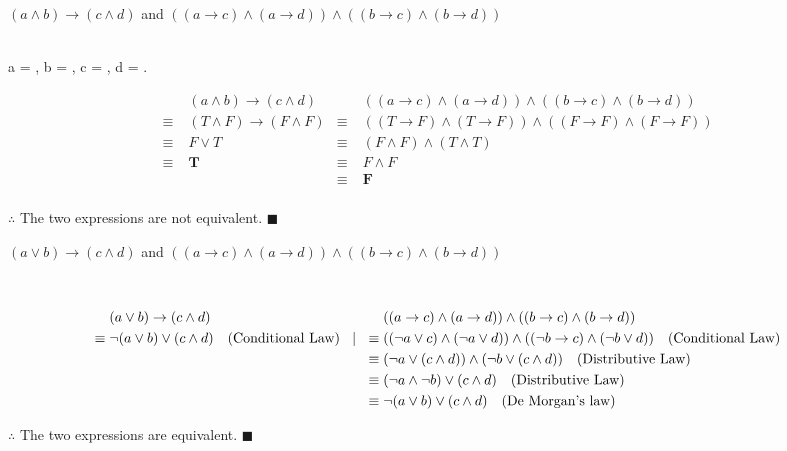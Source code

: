 \documentclass[]{article}
\begin{document}
\begin{question}
    $(a \land b) \rightarrow (c \land d)$ and $((a \rightarrow c) \land (a \rightarrow d)) \land ((b \rightarrow c) \land (b \rightarrow d))$
\end{question}
\begin{center}
         \\
         a = , b = , c = , d = .\\
\end{center}
\begin{align*}
    & (a \land b) \rightarrow (c \land d) & & ((a \rightarrow c) \land (a \rightarrow d)) \land ((b \rightarrow c) \land (b \rightarrow d))\\
    \equiv\; & (T \land F) \rightarrow (F \land F) & \equiv\; & ((T \rightarrow F) \land (T \rightarrow F)) \land ((F \rightarrow F) \land (F \rightarrow F)) \\
    \equiv\; & F \lor T & \equiv\; &  (F \land F) \land (T \land T)\\
    \equiv\; & \mathbf{T} & \equiv\; & F \land F \\
    & &  \equiv\; & \mathbf{F} \\
\end{align*}
\begin{center}
    $\therefore$ The two expressions are not equivalent. $\blacksquare$
\end{center}

\begin{question}
        $(a \lor b) \rightarrow (c \land d)$ and $((a \rightarrow c) \land (a \rightarrow d)) \land ((b \rightarrow c) \land (b \rightarrow d))$
\end{question}
\begin{center}
         \\
\end{center}
\begin{align*}
    & (a \lor b) \rightarrow (c \land d) & & ((a \rightarrow c) \land (a \rightarrow d)) \land ((b \rightarrow c) \land (b \rightarrow d))\\
    \equiv\; & \neg(a \lor b) \lor (c \land d) \quad \text{(Conditional Law)} \quad \vrule & \equiv\; & ((\neg a \lor c) \land (\neg a \lor d)) \land ((\neg b\rightarrow c) \land (\neg b \lor d)) \quad \text{(Conditional Law)}\\
    & \quad \vrule & \equiv\; &  (\neg a \lor (c \land d))\land (\neg b \lor (c \land d)) \quad \text{(Distributive Law)}\\
    & \quad \vrule & \equiv\; & (\neg a \land \neg b ) \lor (c \land d) \quad \text{(Distributive Law)} \\
    & \quad \vrule &  \equiv\; & \neg(a \lor b) \lor (c \land d) \quad \text{(De Morgan's law)} \\
\end{align*}
\begin{center}
    $\therefore$ The two expressions are equivalent. $\blacksquare$
\end{center}
\end{document}
